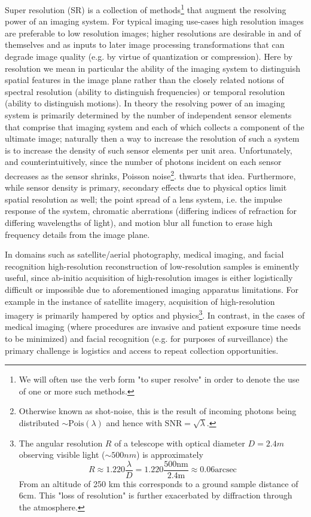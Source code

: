 \documentclass[journal]{IEEEtran}
\begin{document}
    Super resolution (SR) is a collection of methods\footnote{We will often use the verb form "to super resolve"
    in order to denote the use of one or more such methods.} that augment the resolving power of an imaging system.
    For typical imaging use-cases high resolution images are preferable to low resolution images; higher resolutions are
    desirable in and of themselves and as inputs to later
    image processing transformations that can degrade image quality (e.g. by virtue of quantization or compression).
    Here by resolution we mean in particular the ability of the imaging system to distinguish spatial features in
    the image plane rather than the closely related notions of spectral resolution (ability to distinguish frequencies)
    or temporal resolution (ability to distinguish motions). In theory the resolving power of an imaging system is
    primarily determined by the number of independent sensor elements that comprise that imaging system and each of
    which collects a component of the ultimate image; naturally then a way to increase the resolution of such a system
    is to increase the density of such sensor elements
    per unit area. Unfortunately, and counterintuitively, since the number of photons incident on each sensor decreases
    as the sensor shrinks, Poisson noise\footnote{Otherwise known as shot-noise, this is the result of incoming photons
    being distributed $\sim\text{Pois}(\lambda)$ and hence with $\text{SNR} = \sqrt{\lambda}$.}. thwarts that idea.
    Furthermore, while sensor density is primary, secondary effects due to physical optics limit spatial resolution as well;
    the point spread of a lens system, i.e. the impulse response of the system, chromatic aberrations (differing indices of
    refraction for differing wavelengths of light), and motion blur all function to erase high frequency details from
    the image plane.


 In domains such as satellite/aerial photography, medical imaging, and facial recognition
    high-resolution reconstruction of low-resolution samples is eminently useful, since ab-initio acquisition of
    high-resolution images is either logistically difficult or impossible due to aforementioned imaging apparatus limitations. For example in the
    instance of satellite imagery, acquisition of high-resolution imagery is primarily hampered by optics and
    physics\footnote{The angular resolution $R$ of a telescope with optical diameter $D = 2.4m$ observing visible light
    ($\sim500nm$) is approximately\cite{doi:10.1080.14786447908639684} \[R  \approx 1.220\frac{\lambda}{D} = 1.220 \frac{500\text{nm}}{2.4\text{m}} \approx 0.06 \text{arcsec}\]
    From an altitude of 250 km this corresponds to a ground sample distance of 6cm. This "loss of resolution" is further
    exacerbated by diffraction through the atmosphere.}. In contrast, in the cases of medical imaging
    (where procedures are invasive and patient exposure time needs to be minimized\cite{doi:10.1002.cmr.a.21249}) and
    facial recognition (e.g. for purposes of surveillance) the primary challenge is logistics and access to repeat collection
    opportunities. %
\end{document}
